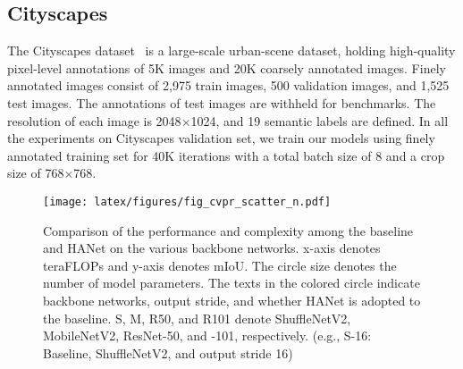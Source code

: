 \documentclass[10pt,twocolumn,letterpaper]{article}
\begin{document}
\vspace*{-0.15cm}
\subsection{Cityscapes}
\vspace*{-0.1cm}
The Cityscapes dataset~\cite{cordts2016cityscapes} is a large-scale urban-scene dataset, holding high-quality pixel-level annotations of 5K images and 20K coarsely annotated images. Finely annotated images consist of 2,975 train images, 500 validation images, and 1,525 test images. The annotations of test images are withheld for benchmarks. The resolution of each image is 2048$\times$1024, and 19 semantic labels are defined.
In all the experiments on Cityscapes validation set, we train our models using finely annotated training set for 40K iterations with a total batch size of 8 and a crop size of 768$\times$768.





\begin{figure}[t]
\begin{center}
\hspace*{-0.3cm}
  \texttt{[image: latex/figures/fig\_cvpr\_scatter\_n.pdf]}
\end{center}
\vspace*{-0.6cm}
   \caption{
Comparison of the performance and complexity among the baseline and HANet on the various backbone networks.
   x-axis denotes teraFLOPs and y-axis denotes mIoU. The circle size denotes the number of model parameters. The texts in the colored circle indicate backbone networks, output stride, and whether HANet is adopted to the baseline. S, M, R50, and R101 denote ShuffleNetV2, MobileNetV2, ResNet-50, and -101, respectively. (e.g.,
   S-16: Baseline, ShuffleNetV2, and output stride 16)}\label{fig:vis_scatter}
\vspace*{-0.5cm}
\end{figure}
\end{document}

